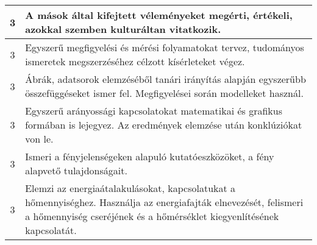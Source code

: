 \begin{longtable}{c | p{12cm} }
                                
                                          3 &  A mások által kifejtett véleményeket megérti, értékeli, azokkal szemben kulturáltan vitatkozik. \\ \hline
                                          3 &  Egyszerű megfigyelési és mérési folyamatokat tervez, tudományos ismeretek megszerzéséhez célzott kísérleteket végez. \\ \hline
                                          3 &  Ábrák, adatsorok elemzéséből tanári irányítás alapján egyszerűbb összefüggéseket ismer fel. Megfigyelései során modelleket használ.  \\ \hline
                                          3 &  Egyszerű arányossági kapcsolatokat matematikai és grafikus formában is lejegyez. Az eredmények elemzése után konklúziókat von le. \\ \hline
                                          3 &  Ismeri a fényjelenségeken alapuló kutatóeszközöket, a fény alapvető tulajdonságait. \\ \hline
                                          3 &  Elemzi az energiaátalakulásokat, kapcsolatukat a hőmennyiséghez. Használja az energiafajták elnevezését, felismeri a hőmennyiség cseréjének és a hőmérséklet kiegyenlítésének kapcsolatát. \\ \hline
                                      

\end{longtable}

